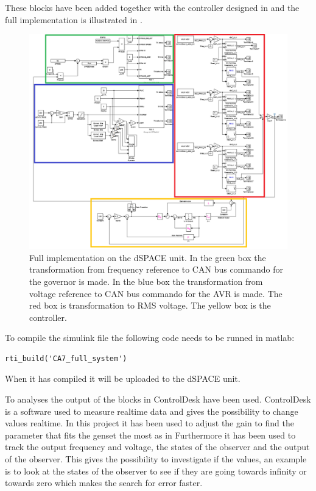 These blocks have been added together with the controller designed in  and the full implementation is illustrated in .
\begin{figure}[H]
\centering
\includegraphics[width=1.1\textwidth]{rapport/billeder/full_implementation}
\caption{Full implementation on the dSPACE unit. In the green box the transformation from frequency reference to CAN bus commando for the governor is made. In the blue box the transformation from voltage reference to CAN bus commando for the AVR is made. The red box is transformation to RMS voltage. The yellow box is the controller.}
\label{fig:full_implementation}
\end{figure} 

To compile the simulink file the following code needs to be runned in matlab:

\begin{lstlisting}
rti_build('CA7_full_system')
\end{lstlisting}

When it has compiled it will be uploaded to the dSPACE unit. 

To analyses the output of the blocks in  ControlDesk have been used. ControlDesk is a software used to measure realtime data and gives the possibility to change values realtime. In this project it has been used to adjust the gain to find the parameter that fits the genset the most as in  Furthermore it has been used to track the output frequency and voltage, the states of the observer and the output of the observer. This gives the possibility to investigate if the values, an example is to look at the states of the observer to see if they are going towards infinity or towards zero which makes the search for error faster. 

